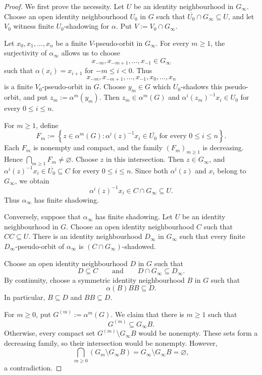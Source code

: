 \documentclass[12pt]{amsart}
\theoremstyle{definition}
\numberwithin{equation}{section}
\theoremstyle{remark}
\begin{document}
\begin{proof}
	We first prove the necessity. Let $U$ be an identity neighbourhood in
	$G_\infty$.  
	Choose an open identity neighbourhood $U_0$ in $G$ such that
	$\overline{U_0}\cap G_\infty\subseteq U$, and let $V_0$ witness finite
	$U_0$-shadowing for $\alpha$. Put $V:=V_0\cap G_\infty$.
	
	Let $x_0,x_1,\ldots,x_n$ be a finite $V$-pseudo-orbit in
	$G_\infty$. For every $m\geq1$, the surjectivity of $\alpha_\infty$
	allows us to choose
	\[
	x_{-m},x_{-m+1},\ldots,x_{-1}\in G_\infty
	\]
	such that $\alpha(x_i)=x_{i+1}$ for $-m\leq i<0$. Thus
	\[
	x_{-m},x_{-m+1},\ldots,x_{-1},x_0,\ldots,x_n
	\]
	is a finite $V_0$-pseudo-orbit in $G$. Choose $y_m\in G$ which
	$U_0$-shadows this pseudo-orbit, and put $z_m:=\alpha^m(y_m)$. Then
	$z_m\in\alpha^m(G)$ and
	$\alpha^i(z_m)^{-1}x_i\in U_0$
	for every $0\leq i\leq n$.
	
	For $m\geq1$, define
	\[
	F_m
	:=
	\left\{
	z\in\alpha^m(G):
	\alpha^i(z)^{-1}x_i\in\overline{U_0}
	\text{ for every }0\leq i\leq n
	\right\}.
	\]
	Each $F_m$ is nonempty and compact, and the family $(F_m)_{m\geq1}$
	is decreasing. Hence
	$\bigcap_{m\geq1}F_m\neq\varnothing.$
	Choose $z$ in this intersection. Then $z\in G_\infty$, and
	$
	\alpha^i(z)^{-1}x_i\in\overline{U_0}\subseteq C
	$
	for every $0\leq i\leq n$. Since both $\alpha^i(z)$ and $x_i$
	belong to $G_\infty$, we obtain
	\[
	\alpha^i(z)^{-1}x_i\in C\cap G_\infty\subseteq U.
	\]
	Thus $\alpha_\infty$ has finite shadowing.
	
	Conversely, suppose that $\alpha_\infty$ has finite shadowing. Let
	$U$ be an identity neighbourhood in $G$. Choose an open identity
	neighbourhood $C$ such that $CC\subseteq U$. There is an identity
	neighbourhood $D_\infty$ in $G_\infty$ such that every finite
	$D_\infty$-pseudo-orbit of $\alpha_\infty$ is
	$(C\cap G_\infty)$-shadowed.
	
	Choose an open identity neighbourhood $D$ in $G$ such that
	\[
	D\subseteq C
	\qquad\text{and}\qquad
	D\cap G_\infty\subseteq D_\infty.
	\]
	By continuity, choose a symmetric identity neighbourhood $B$ in $G$
	such that
	\[
	\alpha(B)BB\subseteq D.
	\]
	In particular, $B\subseteq D$ and $BB\subseteq D$.
	
	For $m\geq0$, put $G^{(m)}:=\alpha^m(G)$. We claim that there is
	$m\geq1$ such that
	\[
	G^{(m)}\subseteq G_\infty B.
	\]
	Otherwise, every compact set $G^{(m)}\setminus G_\infty B$	would be nonempty. These sets form a decreasing family, so their
	intersection would be nonempty. However,
	\[
	\bigcap_{m\geq0}
	\left(G_m\setminus G_\infty B\right)
	=
	G_\infty\setminus G_\infty B
	=
	\varnothing,
	\]
	a contradiction.
	

\end{proof}
\end{document}
